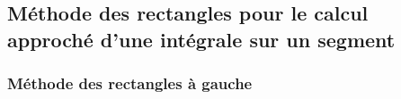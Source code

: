 \documentclass[10pt]{article}
\begin{document}
\begin{minipage}[c]{.48\linewidth}
\begin{pseudo}
\begin{algorithm}[H]
\end{algorithm}
\end{pseudo}
\end{minipage} \hfill
\begin{minipage}[c]{.48\linewidth}
\begin{py}
\begin{python}
\end{python}
\end{py}
\end{minipage} 


\subsection{Méthode des rectangles pour le calcul approché d'une intégrale sur un segment}
\subsubsection{Méthode des rectangles à gauche}
\end{document}
